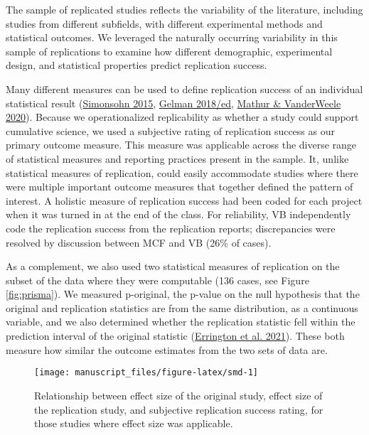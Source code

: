 \documentclass[
  english,
  a4paper,
]{article}
\begin{document}
The sample of replicated studies reflects the variability of the literature, including studies from different subfields, with different experimental methods and statistical outcomes. We leveraged the naturally occurring variability in this sample of replications to examine how different demographic, experimental design, and statistical properties predict replication success.

Many different measures can be used to define replication success of an individual statistical result (\protect\hyperlink{ref-simonsohn2015}{Simonsohn 2015}, \protect\hyperlink{ref-gelman2018}{Gelman 2018/ed}, \protect\hyperlink{ref-mathur2020}{Mathur \& VanderWeele 2020}). Because we operationalized replicability as whether a study could support cumulative science, we used a subjective rating of replication success as our primary outcome measure. This measure was applicable across the diverse range of statistical measures and reporting practices present in the sample. It, unlike statistical measures of replication, could easily accommodate studies where there were multiple important outcome measures that together defined the pattern of interest. A holistic measure of replication success had been coded for each project when it was turned in at the end of the class. For reliability, VB independently code the replication success from the replication reports; discrepancies were resolved by discussion between MCF and VB (26\% of cases).

As a complement, we also used two statistical measures of replication on the subset of the data where they were computable (136 cases, see Figure \ref{fig:prisma}). We measured p-original, the p-value on the null hypothesis that the original and replication statistics are from the same distribution, as a continuous variable, and we also determined whether the replication statistic fell within the prediction interval of the original statistic (\protect\hyperlink{ref-errington2021}{Errington et al. 2021}). These both measure how similar the outcome estimates from the two sets of data are.

\begin{figure}[ht]
\texttt{[image: manuscript\_files/figure-latex/smd-1]} \caption{Relationship between effect size of the original study, effect size of the replication study, and subjective replication success rating, for those studies where effect size was applicable.}\label{fig:smd}
\end{figure}
\end{document}
